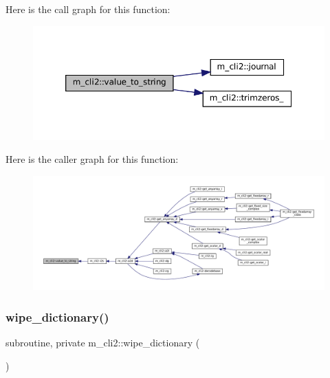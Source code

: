Here is the call graph for this function\+:\nopagebreak
\begin{figure}[H]
\begin{center}
\leavevmode
\includegraphics[width=350pt]{namespacem__cli2_a1bbcefd886dabb0286e2cb14ab54034f_cgraph}
\end{center}
\end{figure}
Here is the caller graph for this function\+:\nopagebreak
\begin{figure}[H]
\begin{center}
\leavevmode
\includegraphics[width=350pt]{namespacem__cli2_a1bbcefd886dabb0286e2cb14ab54034f_icgraph}
\end{center}
\end{figure}
\mbox{\label{namespacem__cli2_ab1525b0419475486f520ef502daa5e94}} 
\subsubsection{\texorpdfstring{wipe\+\_\+dictionary()}{wipe\_dictionary()}}
{\footnotesize\ttfamily subroutine, private m\+\_\+cli2\+::wipe\+\_\+dictionary (\begin{DoxyParamCaption}{ }\end{DoxyParamCaption})\hspace{0.3cm}{\ttfamily [private]}}



